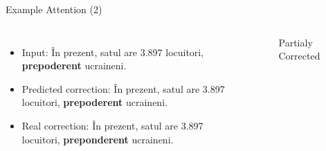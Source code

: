 \documentclass[]{beamer}
\begin{document}
        \begin{frame}{Example Attention (2)}
            
            \begin{columns}
                    \begin{itemize}
                        \item Input: În prezent, satul are 3.897 locuitori, \textbf{prepoderent} ucraineni.
                        \item Predicted correction: În prezent, satul are 3.897 locuitori, \textbf{prepoderent} ucraineni.
                        \item Real correction: În prezent, satul are 3.897 locuitori, \textbf{preponderent} ucraineni.
                    \end{itemize}
                    \begin{figure}[htbp]
                        \centering
                        \caption{Partialy Corrected}
                        \label{fig:attention-examples-2}
                    \end{figure}
            \end{columns}
        
        \end{frame}
        
\end{document}
